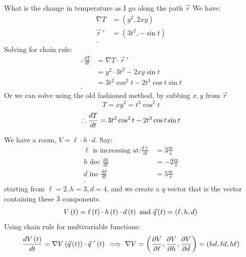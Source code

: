 \begin{itemize}
\begin{example}
		What is the change in temperature as I go along the path $\vec{r}$ We have:
		\begin{align*}
			\nabla T &= \left( y^2 , 2xy\right) \\
			\vec{r}~' &= \left( 3t^2, -\sin t \right)  \\
		.\end{align*}
		Solving for chain rule:
		\begin{align*}
			\therefore \frac{dT}{dt}&= \nabla T \cdot  \vec{r}~' \\
			&= y^2\cdot 3t^2-2xy\sin t \\
			&= 3t^2\cos^2 t - 2t^3\cos t \sin t \\
		.\end{align*}
		Or we can solve using the old fashioned method, by subbing $x,y$ from $\vec{r}$
		\begin{equation}
			T = xy^2 = t^3 \cos^2 t
		\end{equation}
		\begin{equation}
			\therefore \frac{dT}{dt} = 3t^2\cos^2t - 2t^3\cos t \sin t \\
		\end{equation}
	\end{example}
	\begin{example}
		We have a room, $V = \ell\cdot h\cdot d $. Say:
		\begin{align*}
			\ell \text{ is increasing at:} \frac{d\ell}{dt} &=  3 \frac{\text{m}}{\text{s}} \\
			h \text{ dec } \frac{dh}{dt}&= -2 \frac{\text{m}}{\text{s}} \\
			d \text{ inc } \frac{dd}{dt} &= 5 \frac{\text{m}}{\text{s}} \\
		.\end{align*}
		starting from $ \ell = 2, h = 3, d = 4$, and we create a $q$ vector that is the vector containing these 3 components.
		\begin{equation}
			V\left( t \right) = \ell\left( t \right)  \cdot  h\left( t  \right) \cdot d\left( t \right) \text{ and } \vec{q}\left( t \right) = \left( \ell, h, d \right)  \\
		\end{equation}
		Using chain rule for multivariable functions:
		\begin{equation}
			\frac{dV\left( t \right) }{dt}= \nabla V\left( \vec{q}\left( t \right)  \right) \cdot  \vec{q}~'\left( t \right)\\
			\implies \nabla V = \left( \frac{\partial V}{\partial \ell} , \frac{\partial V}{\partial h} , \frac{\partial V}{\partial d}  \right)  = \left(hd, \ell d , h \ell \right) 

\end{equation}
\end{example}
\end{itemize}
